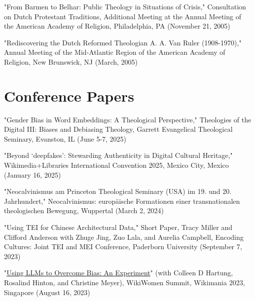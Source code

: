 \documentclass[]{res} %
\begin{document}
\begin{resume}
\begin{hangparas}{.25in}{1}"From Barmen to Belhar: Public Theology in Situations of Crisis," Consultation on Dutch Protestant Traditions, Additional Meeting at the Annual Meeting of the American Academy of Religion, Philadelphia, PA (November 21, 2005)\end{hangparas}

\begin{hangparas}{.25in}{1}"Rediscovering the Dutch Reformed Theologian A. A. Van Ruler (1908-1970)," Annual Meeting of the Mid-Atlantic Region of the American Academy of Religion, New Brunswick, NJ (March, 2005)\end{hangparas}

\section{Conference Papers}

\begin{hangparas}{.25in}{1}"Gender Bias in Word Embeddings: A Theological Perspective," Theologies of the Digital III: Biases and Debiasing Theology, Garrett Evangelical Theological Seminary, Evanston, IL (June 5-7, 2025)\end{hangparas}

\begin{hangparas}{.25in}{1}"Beyond ‘deepfakes’: Stewarding Authenticity in Digital Cultural Heritage," Wikimedia+Libraries International Convention 2025, Mexico City, Mexico (January 16, 2025)\end{hangparas}

\begin{hangparas}{.25in}{1}"Neocalvinismus am Princeton Theological Seminary (USA) im 19. und 20. Jahrhundert," Neocalvinismus: europäische Formationen einer transnationalen theologischen Bewegung, Wuppertal (March 2, 2024)\end{hangparas}

\begin{hangparas}{.25in}{1}"Using TEI for Chinese Architectural Data," Short Paper, Tracy Miller and Clifford Anderson with Zhuge Jing, Zuo Lala, and Aurelia Campbell, Encoding Cultures: Joint TEI and MEI Conference, Paderborn University (September 7, 2023)\end{hangparas}

\begin{hangparas}{.25in}{1}"\href{https://wikimania.wikimedia.org/wiki/2023:WikiWomen_Summit}{Using LLMs to Overcome Bias: An Experiment}" (with Colleen D Hartung, Rosalind Hinton, and Christine Meyer), WikiWomen Summit, Wikimania 2023, Singapore (August 16, 2023)\end{hangparas}


\end{resume}
\end{document}
